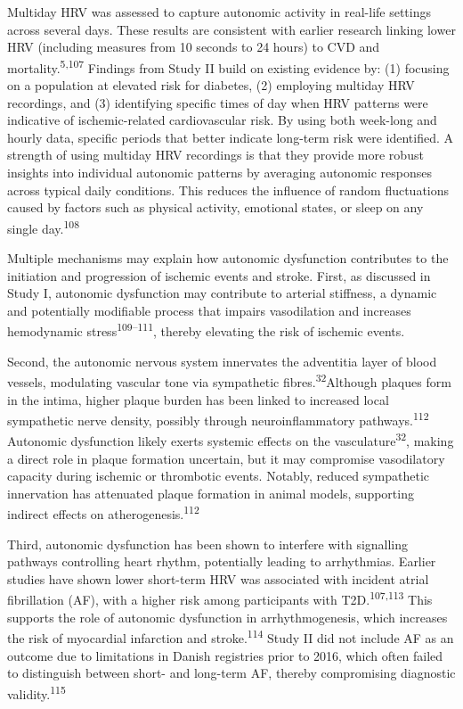 \documentclass[
  a4paper,
  headsepline=true,
  open=left]{scrbook}
\begin{document}
Multiday HRV was assessed to capture autonomic activity in real-life
settings across several days. These results are consistent with earlier
research linking lower HRV (including measures from 10 seconds to 24
hours) to CVD and mortality.\textsuperscript{5,107} Findings from Study
II build on existing evidence by: (1) focusing on a population at
elevated risk for diabetes, (2) employing multiday HRV recordings, and
(3) identifying specific times of day when HRV patterns were indicative
of ischemic-related cardiovascular risk. By using both week-long and
hourly data, specific periods that better indicate long-term risk were
identified. A strength of using multiday HRV recordings is that they
provide more robust insights into individual autonomic patterns by
averaging autonomic responses across typical daily conditions. This
reduces the influence of random fluctuations caused by factors such as
physical activity, emotional states, or sleep on any single
day.\textsuperscript{108}

Multiple mechanisms may explain how autonomic dysfunction contributes to
the initiation and progression of ischemic events and stroke. First, as
discussed in Study I, autonomic dysfunction may contribute to arterial
stiffness, a dynamic and potentially modifiable process that impairs
vasodilation and increases hemodynamic stress\textsuperscript{109--111},
thereby elevating the risk of ischemic events.

Second, the autonomic nervous system innervates the adventitia layer of
blood vessels, modulating vascular tone via sympathetic
fibres.\textsuperscript{32}Although plaques form in the intima, higher
plaque burden has been linked to increased local sympathetic nerve
density, possibly through neuroinflammatory
pathways.\textsuperscript{112} Autonomic dysfunction likely exerts
systemic effects on the vasculature\textsuperscript{32}, making a direct
role in plaque formation uncertain, but it may compromise vasodilatory
capacity during ischemic or thrombotic events. Notably, reduced
sympathetic innervation has attenuated plaque formation in animal
models, supporting indirect effects on
atherogenesis.\textsuperscript{112}

Third, autonomic dysfunction has been shown to interfere with signalling
pathways controlling heart rhythm, potentially leading to arrhythmias.
Earlier studies have shown lower short-term HRV was associated with
incident atrial fibrillation (AF), with a higher risk among participants
with T2D.\textsuperscript{107,113} This supports the role of autonomic
dysfunction in arrhythmogenesis, which increases the risk of myocardial
infarction and stroke.\textsuperscript{114} Study II did not include AF
as an outcome due to limitations in Danish registries prior to 2016,
which often failed to distinguish between short- and long-term AF,
thereby compromising diagnostic validity.\textsuperscript{115}
\end{document}
